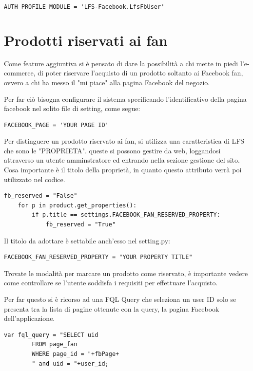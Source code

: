 \begin{lstlisting}
AUTH_PROFILE_MODULE = 'LFS-Facebook.LfsFbUser'
\end{lstlisting}

\section{Prodotti riservati ai fan}
Come feature aggiuntiva si è pensato di dare la possibilità a chi mette in piedi l'e-commerce, di poter riservare l'acquisto di un prodotto soltanto ai Facebook fan, ovvero a chi ha messo il "mi piace" alla pagina Facebook del negozio.

Per far ciò bisogna configurare il sistema specificando l'identificativo della pagina facebook nel solito file di setting, come segue:

\begin{lstlisting}
FACEBOOK_PAGE = 'YOUR PAGE ID'
\end{lstlisting}

Per distinguere un prodotto riservato ai fan, si utilizza una caratteristica di LFS che sono le "PROPRIETA". queste si possono gestire da web, loggandosi attraverso un utente amminstratore ed entrando nella sezione gestione del sito. Cosa importante è il titolo della proprietà, in quanto questo attributo verrà poi utilizzato nel codice.

\begin{lstlisting}
fb_reserved = "False"
    for p in product.get_properties():
        if p.title == settings.FACEBOOK_FAN_RESERVED_PROPERTY:
            fb_reserved = "True"            
\end{lstlisting}

Il titolo da adottare è settabile anch'esso nel setting.py:

\begin{lstlisting}
FACEBOOK_FAN_RESERVED_PROPERTY = "YOUR PROPERTY TITLE"
\end{lstlisting}

Trovate le modalità per marcare un prodotto come riservato, è importante vedere come controllare se l'utente soddisfa i requisiti per effettuare l'acquisto.

Per far questo si è ricorso ad una FQL Query che seleziona un user ID solo se presenta tra la lista di pagine ottenute con la query, la pagina Facebook dell'applicazione.

\begin{lstlisting}
var fql_query = "SELECT uid 
		FROM page_fan 
		WHERE page_id = "+fbPage+
		" and uid = "+user_id;				
\end{lstlisting}

